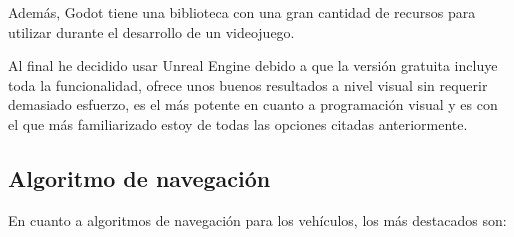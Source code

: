 \documentclass[a4paper,11pt]{book}
\begin{document}
\bigskip

Además, Godot tiene una biblioteca con una gran cantidad de recursos para utilizar durante el desarrollo de un videojuego.


\bigskip

Al final he decidido usar Unreal Engine debido a que la versión gratuita incluye toda la funcionalidad, ofrece unos buenos resultados a nivel visual sin requerir demasiado esfuerzo, es el más potente en cuanto a programación visual y es con el que más familiarizado estoy de todas las opciones citadas anteriormente.

\subsection{Algoritmo de navegación}
En cuanto a algoritmos de navegación para los vehículos, los más destacados son:
\end{document}
